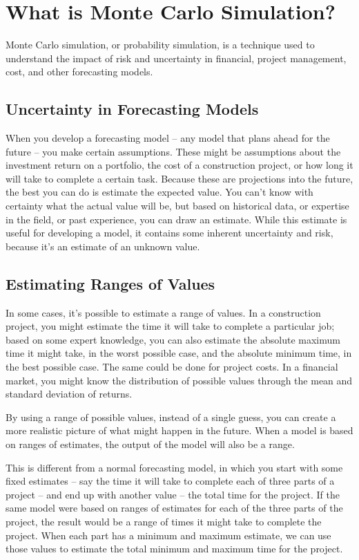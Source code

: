 \section*{What is Monte Carlo Simulation?}
Monte Carlo simulation, or probability simulation, is a technique used to understand the impact of risk
and uncertainty in financial, project management, cost, and other forecasting models.
\subsection*{Uncertainty in Forecasting Models}
When you develop a forecasting model – any model that plans ahead for the future – you make certain
assumptions. These might be assumptions about the investment return on a portfolio, the cost of a
construction project, or how long it will take to complete a certain task. Because these are projections
into the future, the best you can do is estimate the expected value.
You can't know with certainty what the actual value will be, but based on historical data, or expertise in
the field, or past experience, you can draw an estimate. While this estimate is useful for developing a
model, it contains some inherent uncertainty and risk, because it's an estimate of an unknown value.
\subsection*{Estimating Ranges of Values}
In some cases, it's possible to estimate a range of values. In a construction project, you might estimate
the time it will take to complete a particular job; based on some expert knowledge, you can also
estimate the absolute maximum time it might take, in the worst possible case, and the absolute
minimum time, in the best possible case. The same could be done for project costs. In a financial
market, you might know the distribution of possible values through the mean and standard deviation of
returns.

By using a range of possible values, instead of a single guess, you can create a more realistic picture of
what might happen in the future. When a model is based on ranges of estimates, the output of the
model will also be a range. 

This is different from a normal forecasting model, in which you start with some fixed estimates – say
the time it will take to complete each of three parts of a project – and end up with another value – the
total time for the project. If the same model were based on ranges of estimates for each of the three
parts of the project, the result would be a range of times it might take to complete the project. When
each part has a minimum and maximum estimate, we can use those values to estimate the total
minimum and maximum time for the project.
